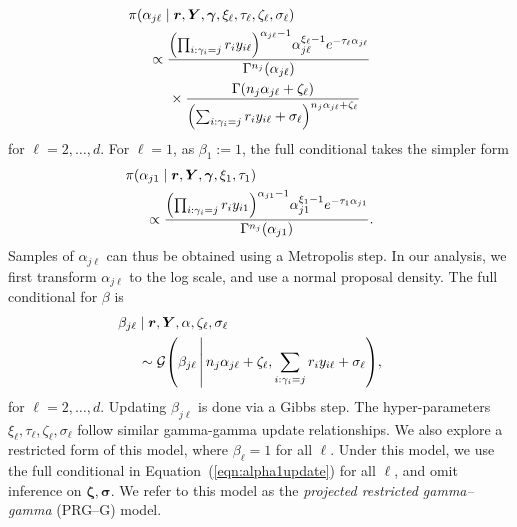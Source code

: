 \begin{equation}
    \label{eqn:alphalupdate}
    \begin{aligned}
    &\hspace{-0.5cm}\pi(\alpha_{j\ell}\mid \bm{r},\bm{Y},\bm{\gamma},\xi_\ell,\tau_\ell,\zeta_\ell,\sigma_\ell) \\
    &\propto \frac{\left(\prod_{i:\gamma_i = j}r_iy_{i\ell}\right)^{\alpha_{j\ell} - 1}\alpha_{j\ell}^{\xi_\ell - 1}e^{-\tau_\ell \alpha_{j\ell}}}{\Gamma^{n_j}(\alpha_{j\ell})} \\
    &\hspace{0.5cm}\times \frac{\Gamma\left(n_j\alpha_{j\ell} + \zeta_{\ell}\right)}{\left(\sum_{i:\gamma_i = j}r_iy_{i\ell} + \sigma_{\ell}\right)^{n_j\alpha_{j\ell} + \zeta_{\ell}}}
    \end{aligned}
\end{equation}
for $\ell = 2,\ldots,d$.  For $\ell = 1$, as $\beta_{1} := 1$, the full conditional takes the simpler form
\begin{equation}
    \label{eqn:alpha1update}
    \begin{aligned}
    &\hspace{-0.5cm}\pi(\alpha_{j1}\mid\bm{r},\bm{Y},\bm{\gamma},\xi_1,\tau_1) \\
    &\propto \frac{\left(\prod_{i:\gamma_i = j}r_iy_{i1}\right)^{\alpha_{j1} - 1}\alpha_{j1}^{\xi_1 - 1}e^{-\tau_1\alpha_{j1}}}{\Gamma^{n_j}(\alpha_{j1})}.
    \end{aligned}
\end{equation}
Samples of $\alpha_{j\ell}$ can thus be obtained using a Metropolis step. In our analysis, we first transform $\alpha_{j\ell}$ to the log scale, and use a normal proposal density.
The full conditional for $\beta$ is 
\begin{equation}
    \label{eqn:betafc}
    \begin{aligned}
    &\hspace{-0.5cm}\beta_{j\ell}\mid\bm{r},\bm{Y},\alpha,\zeta_{\ell},\sigma_{\ell} \\
    &\sim \mathcal{G}\left(\beta_{j\ell}\bigmid n_j\alpha_{j\ell} + \zeta_\ell, \sum_{i:\gamma_i = j}r_iy_{i\ell} + \sigma_{\ell}\right),
    \end{aligned}
\end{equation}
for $\ell = 2,\ldots, d$.  Updating $\beta_{j\ell}$ is done via a Gibbs step.  The hyper-parameters
$\xi_{\ell},\tau_{\ell},\zeta_{\ell},\sigma_{\ell}$ follow similar gamma-gamma update relationships.
We also explore a restricted form of this model, where $\beta_{\ell} = 1$ for all $\ell$.  Under this 
model, we use the full conditional in Equation~(\ref{eqn:alpha1update}) for all $\ell$, and omit 
inference on $\bm{\zeta},\bm{\sigma}$.  We refer to this model as the 
\emph{projected restricted gamma--gamma} (PRG--G) model.

